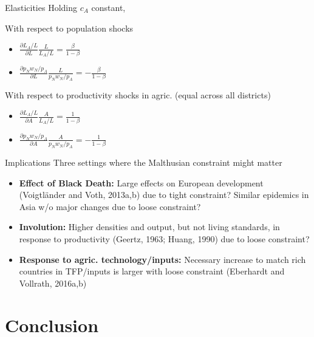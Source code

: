 \documentclass[10pt, xcolor=dvipsnames]{beamer}
\begin{document}
\begin{frame}{Elasticities}\label{elasticity}
Holding $c_A$ constant, 

\vspace{.2cm}With respect to population shocks
\begin{itemize}
  \item $\frac{\partial L_A/L}{\partial L}\frac{L}{L_A/L} = \frac{\beta}{1-\beta}$
  \item $\frac{\partial p_Nw_N/p_A}{\partial L}\frac{L}{p_Nw_N/p_A} = -\frac{\beta}{1-\beta}$
\end{itemize}
With respect to productivity shocks in agric. (equal across all districts)
\begin{itemize}
  \item $\frac{\partial L_A/L}{\partial A}\frac{A}{L_A/L} = \frac{1}{1-\beta}$
  \item $\frac{\partial p_Nw_N/p_A}{\partial A}\frac{A}{p_Nw_N/p_A} = -\frac{1}{1-\beta}$
\end{itemize}
\hfill \hyperlink{calibration}{}

\hfill \hyperlink{model}{}
\end{frame}

\begin{frame}{Implications}
Three settings where the Malthusian constraint might matter
\begin{itemize}
  \item \textbf{Effect of Black Death:} Large effects on European development (Voigtl{\"a}nder and Voth, 2013a,b) due to tight constraint? Similar epidemics in Asia w/o major changes due to loose constraint?
  \item \textbf{Involution:} Higher densities and output, but not living standards, in response to productivity (Geertz, 1963; Huang, 1990) due to loose constraint?
  \item \textbf{Response to agric. technology/inputs:} Necessary increase to match rich countries in TFP/inputs is larger with loose constraint (Eberhardt and Vollrath, 2016a,b)
\end{itemize}

\end{frame}
\section{Conclusion}
\end{document}
